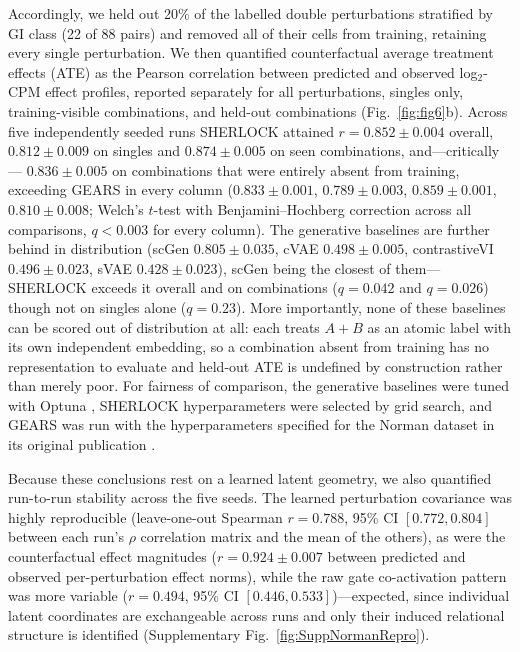 Accordingly, we held out 20\% of the labelled double perturbations
stratified by GI class (22 of 88 pairs) and removed all of their cells from training, retaining every
single perturbation. We then quantified counterfactual average treatment effects (ATE) as the
Pearson correlation between predicted and observed log$_2$-CPM effect profiles, reported separately
for all perturbations, singles only, training-visible combinations, and held-out combinations
(Fig.~\ref{fig:fig6}b). Across five independently seeded runs SHERLOCK attained $r=0.852\pm0.004$
overall, $0.812\pm0.009$ on singles and $0.874\pm0.005$ on seen combinations, and---critically---
$0.836\pm0.005$ on combinations that were entirely absent from training, exceeding GEARS in every
column ($0.833\pm0.001$, $0.789\pm0.003$, $0.859\pm0.001$, $0.810\pm0.008$; Welch's $t$-test with
Benjamini--Hochberg correction across all comparisons, $q<0.003$ for every column). The generative
baselines are further behind in distribution (scGen $0.805\pm0.035$, cVAE $0.498\pm0.005$,
contrastiveVI $0.496\pm0.023$, sVAE $0.428\pm0.023$), scGen being the closest of them---SHERLOCK
exceeds it overall and on combinations ($q=0.042$ and $q=0.026$) though not on singles alone
($q=0.23$). More importantly, none of these baselines can be scored out of distribution at all: each
treats $A{+}B$ as an atomic label with its own independent embedding, so a combination absent from
training has no representation to evaluate and held-out ATE is undefined by construction rather than
merely poor. For fairness of comparison, the generative baselines were tuned with Optuna
\cite{akiba2019optuna}, SHERLOCK hyperparameters were selected by grid search, and GEARS was run with
the hyperparameters specified for the Norman dataset in its original publication
\cite{roohani2023gears}.

Because these conclusions rest on a learned latent geometry, we also quantified run-to-run stability
across the five seeds. The learned perturbation covariance was highly reproducible (leave-one-out
Spearman $r=0.788$, 95\% CI $[0.772,0.804]$ between each run's $\rho$ correlation matrix and the mean
of the others), as were the counterfactual effect magnitudes ($r=0.924\pm0.007$ between predicted and
observed per-perturbation effect norms), while the raw gate co-activation pattern was more variable
($r=0.494$, 95\% CI $[0.446,0.533]$)---expected, since individual latent coordinates are exchangeable
across runs and only their induced relational structure is identified
(Supplementary Fig.~\ref{fig:SuppNormanRepro}).

